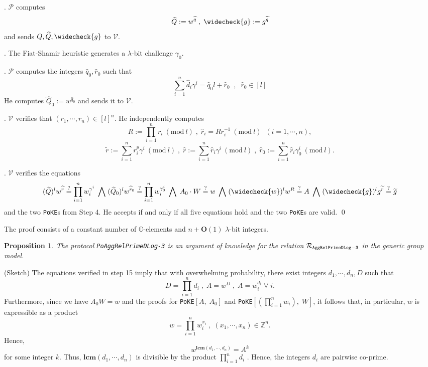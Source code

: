 \documentclass[11pt, lettersize, notitlepage, leqno, footskip=0.6cm]{article}
\newcommand{\bz}{\mathbb Z}
\newcommand{\pl}{\prod\limits}
\newcommand{\slim}{\sum\limits}
\newcommand{\wti}{\widetilde}
\newcommand{\mc}{\mathcal}
\newcommand{\mb}{\mathbb}
\newcommand{\mbf}{\mathbf}
\newcommand{\lam}{\lambda}
\newcommand{\what}{\widehat}
\newcommand{\weck}{\widecheck}
\newcommand{\bO}{\mbf{O}}
\newcommand{\mP}{\mc{P}}
\newcommand{\V}{\mc{V}}
\newcommand{\vs}{\vspace{-0.15cm}}
\newcommand{\noin}{\noindent}
\newcommand{\op}{overwhelming probability}
\newcommand{\sta}{\stackrel{?}{=}}
\newcommand{\Mod}[1]{\ (\mathrm{mod}\ #1)}
\newcommand{\LCM}{\mbf{lcm}}
\newtheorem{Prop}[Thm]{Proposition}
\numberwithin{equation}{section}
\begin{document}
\begin{enumerate}[wide, labelwidth=!, labelindent=0pt]
\noin 11. $\mP$ computes \vs $$ \what{Q}:= w^{\what{q}}\;,\;\weck{g}:= g^{\wti{q}}$$ and sends $Q, \what{Q}, \weck{g}$ to $\V$.

\noin 12. The Fiat-Shamir heuristic generates a $\lam$-bit challenge $\gamma_0$.

\noin 13. $\mP$ computes the integers $\what{q}_0, \what{r}_0$ such that \vs $$\slim_{i=1}^n \what{d}_i\gamma^i = \what{q}_0 l+\what{r}_0\;\;,\;\;\what{r}_0\in [l]$$ He computes $\what{Q}_0:= w^{\what{q}_0} $ and sends it to $\V$.

\noin 14. $\V$ verifies that $(r_1,\cdots,r_n)\in [l]^{n}$. He independently computes \vs $$R:= \pl_{i=1}^n r_i\Mod{l} \;,\;\what{r}_i = Rr_i^{-1}\Mod{l}\;\;(i=1,\cdots,n),$$\vspace{-0.3cm} $$\wti{r}:= \slim_{i=1}^n {r}_i^{p}\gamma^i\Mod{l} \;,\; \what{r}:= \slim_{i=1}^n \what{r}_i\gamma^i\Mod{l}\;,\;\what{r}_0:= \slim_{i=1}^n \what{r}_i\gamma_0^i\Mod{l}.$$

\noin 15. $\V$ verifies the equations \vs $$(\what{Q})^lw^{\what{r}}\sta \pl_{i=1}^n w_i^{\gamma^i} \;\bigwedge\; (\what{Q}_0)^lw^{\what{r}_0}\sta \pl_{i=1}^n w_i^{\gamma_0^i}\;\bigwedge\; A_0\cdot W\sta w\;\bigwedge\; (\weck{w})^lw^R\sta A\;\bigwedge\; (\weck{g})^lg^{\wti{r}}\sta\wti{g}$$ and the two \verb|PoKE|s from Step 4. He accepts if and only if all five equations hold and the two \verb|PoKE|s are valid. 
\qed \end{enumerate}

\noin The proof consists of a constant number of $\mb{G}$-elements and $n+\bO(1)$ $\lam$-bit integers.

\vspace{0.1cm}


\begin{Prop} The protocol \verb|PoAggRelPrimeDLog-3| is an argument of knowledge for the relation $\mc{R}_{\tt{AggRelPrimeDLog-3}}$ in the generic group model.\end{Prop}

\begin{prf} (Sketch) The equations verified in step 15 imply that with \op, there exist integers $d_1,\cdots,d_n, D$ such that \vs $$D = \pl_{i=1}^n d_i\;,\;A = w^D\;,\; A= w_i^{d_i}\;\forall \;i .$$ Furthermore, since we have $A_0W = w$ and the proofs for \verb|PoKE|$[A,\;A_0]$ and \verb|PoKE|$[(\pl_{i=1}^n w_i),\; W]$, it follows that, in particular, $w$ is expressible as a product \vs $$w =\pl_{i=1}^n w_i^{x_i}\;,\;(x_1,\cdots,x_n)\in\bz^n.$$ Hence, \vs $$w^{\LCM(d_1,\cdots,d_n)} = A^k$$ for some integer $k$. Thus, $\LCM(d_1,\cdots,d_n)$ is divisible by the product $\pl_{i=1}^n d_i$ . Hence, the integers $d_i$ are pairwise co-prime.\end{prf}
\end{document}
